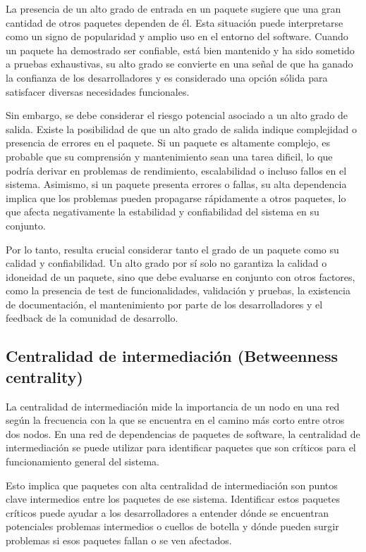 La presencia de un alto grado de entrada en un paquete sugiere que una gran cantidad de otros paquetes dependen de él. Esta situación puede interpretarse como un signo de popularidad y amplio uso en el entorno del software. Cuando un paquete ha demostrado ser confiable, está bien mantenido y ha sido sometido a pruebas exhaustivas, su alto grado se convierte en una señal de que ha ganado la confianza de los desarrolladores y es considerado una opción sólida para satisfacer diversas necesidades funcionales.

Sin embargo, se debe considerar el riesgo potencial asociado a un alto grado de salida. Existe la posibilidad de que un alto grado de salida indique complejidad o presencia de errores en el paquete. Si un paquete es altamente complejo, es probable que su comprensión y mantenimiento sean una tarea dificil, lo que podría derivar en problemas de rendimiento, escalabilidad o incluso fallos en el sistema. Asimismo, si un paquete presenta errores o fallas, su alta dependencia implica que los problemas pueden propagarse rápidamente a otros paquetes, lo que afecta negativamente la estabilidad y confiabilidad del sistema en su conjunto.

Por lo tanto, resulta crucial considerar tanto el grado de un paquete como su calidad y confiabilidad. Un alto grado por sí solo no garantiza la calidad o idoneidad de un paquete, sino que debe evaluarse en conjunto con otros factores, como la presencia de test de funcionalidades, validación y pruebas, la existencia de documentación, el mantenimiento por parte de los desarrolladores y el feedback de la comunidad de desarrollo. 

\subsection{Centralidad de intermediación (Betweenness centrality)}

La centralidad de intermediación mide la importancia de un nodo en una red según la frecuencia con la que se encuentra en el camino más corto entre otros dos nodos. En una red de dependencias de paquetes de software, la centralidad de intermediación se puede utilizar para identificar paquetes que son críticos para el funcionamiento general del sistema.

Esto implica que paquetes con alta centralidad de intermediación son puntos clave intermedios entre los paquetes de ese sistema. Identificar estos paquetes críticos puede ayudar a los desarrolladores a entender dónde se encuentran potenciales problemas intermedios o cuellos de botella y dónde pueden surgir problemas si esos paquetes fallan o se ven afectados.

